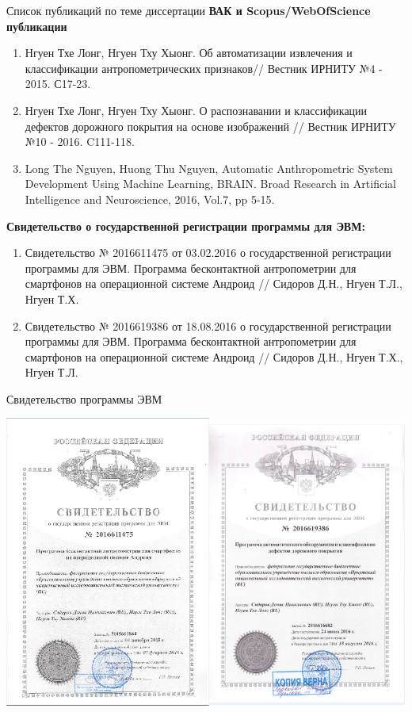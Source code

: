 \documentclass[10pt,pdf,hyperref={unicode},xcolor=table]{beamer}
\begin{document}
\begin{frame}{Список публикаций по теме диссертации}
    \textbf{ВАК и Scopus/WebOfScience публикации}
		\begin{enumerate}
  \item Нгуен Тхе Лонг, Нгуен Тху Хыонг. Об автоматизации извлечения и классификации антропометрических признаков// Вестник ИРНИТУ №4 - 2015. С17-23.
	\item Нгуен Тхе Лонг, Нгуен Тху Хыонг. О распознавании и классификации дефектов дорожного покрытия на основе изображений // Вестник ИРНИТУ №10 - 2016. C111-118.
	\item Long The Nguyen, Huong Thu Nguyen, Automatic Anthropometric System
Development Using Machine Learning, BRAIN. Broad Research in Artificial
Intelligence and Neuroscience, 2016, Vol.7, pp 5-15.	
	\end{enumerate} 
\textbf{Свидетельство о государственной регистрации программы для ЭВМ:}
			\begin{enumerate}
			\item  Свидетельство № 2016611475 от 03.02.2016 о государственной регистрации программы для ЭВМ. Программа бесконтактной антропометрии для смартфонов на операционной системе Андроид // Сидоров Д.Н., Нгуен Т.Л., Нгуен Т.Х.
	\item  Свидетельство № 2016619386 от 18.08.2016 о государственной регистрации программы для ЭВМ. Программа бесконтактной антропометрии для смартфонов на операционной системе Андроид // Сидоров Д.Н.,  Нгуен Т.Х., Нгуен Т.Л.
	\end{enumerate} 	
		\end {frame}
	\begin{frame}{Свидетельство программы ЭВМ}	 

\begin{center}
     \includegraphics[width=1\linewidth]{p23}
\end{center}

			\end{frame}		
\end{document}
